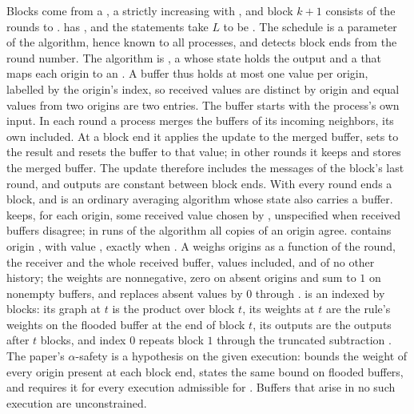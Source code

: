 Blocks come from a , a strictly increasing  with , and block $k+1$ consists of the rounds  to .  has , and the statements take $L$ to be . The schedule is a parameter of the algorithm, hence known to all processes, and  detects block ends from the round number. The algorithm is , a  whose state holds the output  and a  that maps each origin to an . A buffer thus holds at most one value per origin, labelled by the origin's index, so received values are distinct by origin and equal values from two origins are two entries. The buffer starts with the process's own input. In each round a process merges the buffers of its incoming neighbors, its own included. At a block end it applies the update to the merged buffer, sets  to the result and resets the buffer to that value; in other rounds it keeps  and stores the merged buffer. The update therefore includes the messages of the block's last round, and outputs are constant between block ends. With  every round ends a block, and  is an ordinary averaging algorithm whose state also carries a buffer.  keeps, for each origin, some received value chosen by , unspecified when received buffers disagree; in runs of the algorithm all copies of an origin agree.  contains origin , with value , exactly when . A  weighs origins as a function of the round, the receiver and the whole received buffer, values included, and of no other history; the weights are nonnegative, zero on absent origins and sum to $1$ on nonempty buffers, and  replaces absent values by $0$ through .  is an  indexed by blocks: its graph at $t$ is the product over block $t$, its weights at $t$ are the rule's weights on the flooded buffer  at the end of block $t$, its outputs  are the outputs after $t$ blocks, and index $0$ repeats block $1$ through the truncated subtraction . The paper's $\alpha$-safety is a hypothesis on the given execution:  bounds the weight of every origin present at each block end,  states the same bound on flooded buffers, and  requires it for every execution admissible for . Buffers that arise in no such execution are unconstrained.

